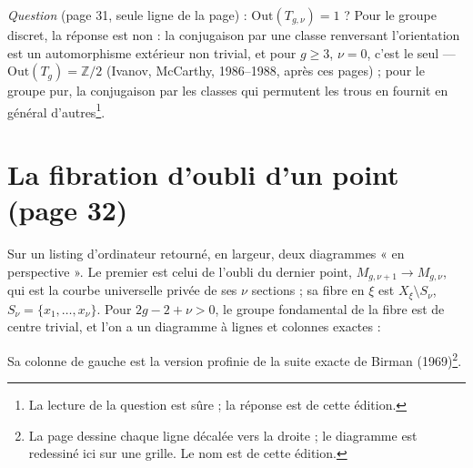 \documentclass[11pt,a4paper]{article}
\begin{document}
\emph{Question} (page 31, seule ligne de la page) : $\mathrm{Out}(T_{g,\nu}) =
1$ ? Pour le groupe discret, la réponse est non : la conjugaison par une
classe renversant l'orientation est un automorphisme extérieur non trivial, et
pour $g \geq 3$, $\nu = 0$, c'est le seul — $\mathrm{Out}(T_g) = \mathbb{Z}/2$
(Ivanov, McCarthy, 1986--1988, après ces pages) ; pour le groupe pur, la
conjugaison par les classes qui permutent les trous en fournit en général
d'autres\footnote{La lecture de la question est sûre ; la réponse est de
cette édition.}.

\section*{La fibration d'oubli d'un point (page 32)}

Sur un listing d'ordinateur retourné, en largeur, deux diagrammes « en
perspective ». Le premier est celui de l'oubli du dernier point, $M_{g,\nu+1}
\to M_{g,\nu}$, qui est la courbe universelle privée de ses $\nu$ sections ;
sa fibre en $\xi$ est $X_\xi \setminus S_\nu$, $S_\nu = \{x_1, \ldots, x_\nu\}$.
Pour $2g - 2 + \nu > 0$, le groupe fondamental de la fibre est de centre
trivial, et l'on a un diagramme à lignes et colonnes exactes :


Sa colonne de gauche est la version profinie de la suite exacte de Birman
(1969)\footnote{La page dessine chaque ligne décalée vers la droite ; le
diagramme est redessiné ici sur une grille. Le nom est de cette édition.}.
\end{document}
